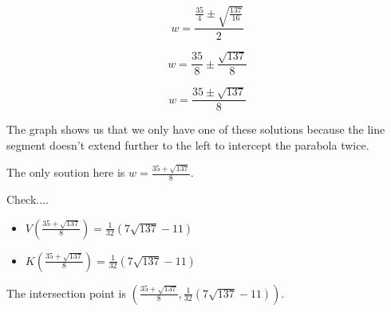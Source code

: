\documentclass{ximera}
\begin{document}
\[   w = \frac{\tfrac{35}{4} \pm  \sqrt{\tfrac{137}{16}}}{2}     \]


\[   w = \frac{35}{8} \pm  \frac{\sqrt{137}}{8}   \]


\[   w = \frac{35 \pm \sqrt{137}}{8}    \]



The graph shows us that we only have one of these solutions because the line segment doesn't extend further to the left to intercept the parabola twice.


The only soution here is $w = \frac{35 + \sqrt{137}}{8} $.








Check....
\begin{itemize}
\item $V\left(\frac{35 + \sqrt{137}}{8}\right) =  \frac{1}{32}(7 \sqrt{137} - 11)  $




\item $K\left(\frac{35 + \sqrt{137}}{8}\right) =  \frac{1}{32}(7 \sqrt{137} - 11)  $
\end{itemize}


The intersection point is $\left(\frac{35 + \sqrt{137}}{8}, \frac{1}{32}(7 \sqrt{137} - 11) \right)$.
\end{document}
